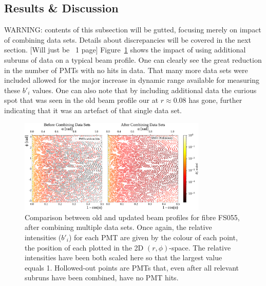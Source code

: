\subsection{Results \& Discussion}\label{sect:results}
{
    \color{blue}
    WARNING: contents of this subsection will be gutted, focusing merely on impact of combining data sets. Details about discrepancies will be covered in the next section.
    [Will just be ~1 page]
}
Figure~\ref{fig:updated_beam_profile} shows the impact of using additional subruns of data on a typical beam profile. One can clearly see the great reduction in the number of PMTs with no hits in data. That many more data sets were included allowed for the major increase in dynamic range available for measuring these $b'_{i}$ values. One can also note that by including additional data the curious spot that was seen in the old beam profile our at $r\approx0.08$ has gone, further indicating that it was an artefact of that single data set.
\begin{figure}
    \centering
    \includegraphics[width=0.8\textwidth]{4_SMELLIESimulation/images/flat_plot_r_comparison_FS055_old_vs_new_empty_circles.pdf}
    \caption[Comparison between old and updated beam profiles for fibre FS055, after combining multiple data sets]{Comparison between old and updated beam profiles for fibre FS055, after combining multiple data sets. Once again, the relative intensities ($b'_{i}$) for each PMT are given by the colour of each point, the position of each plotted in the 2D $(r,\phi)$-space. The relative intensities have been both scaled here so that the largest value equals 1. Hollowed-out points are PMTs that, even after all relevant subruns have been combined, have no PMT hits.}
    \label{fig:updated_beam_profile}
\end{figure}

